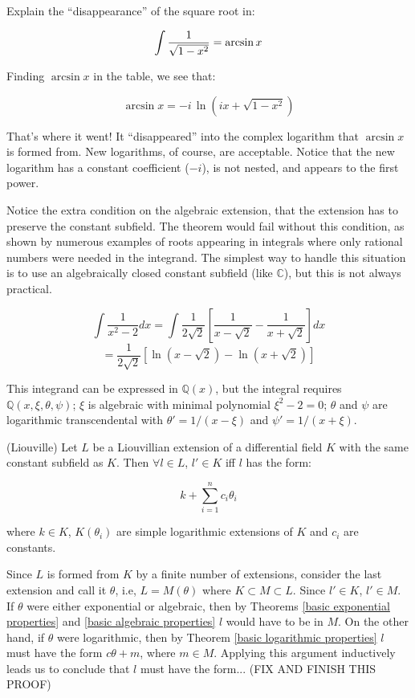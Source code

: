 \endtheorem

\example

Explain the ``disappearance'' of the square root in:

$$\int{1\over\sqrt{1-x^2}} = \arcsin x$$

Finding $\arcsin x$ in the table, we see that:

$$\arcsin x = -i \,\ln (ix + \sqrt{1-x^2})$$

That's where it went!  It ``disappeared'' into the complex logarithm
that $\arcsin x$ is formed from.  New logarithms, of course, are
acceptable.  Notice that the new logarithm has a constant coefficient
($-i$), is not nested, and appears to the first power.

\endexample

Notice the extra condition on the algebraic extension, that the
extension has to preserve the constant subfield.  The theorem would
fail without this condition, as shown by numerous examples of roots
appearing in integrals where only rational numbers were needed in the
integrand.  The simplest way to handle this situation is to use an
algebraically closed constant subfield (like ${\mathbb C}$), but
this is not always practical.

\example

$$\int \frac{1}{x^2-2} dx = \int \frac{1}{2\sqrt{2}} \left[ \frac{1}{x-\sqrt{2}} - \frac{1}{x+\sqrt{2}} \right] dx$$
$$= \frac{1}{2\sqrt{2}} \left[ \ln(x-\sqrt{2}) - \ln(x+\sqrt{2}) \right]$$

This integrand can be expressed in ${\mathbb Q}(x)$, but the integral
requires ${\mathbb Q}(x,\xi,\theta,\psi)$; $\xi$ is algebraic
with minimal polynomial $\xi^2-2=0$; $\theta$ and $\psi$ are
logarithmic transcendental with $\theta' = 1/(x-\xi)$
and $\psi' = 1/(x+\xi)$.

\endexample

\theorem (Liouville) Let $L$ be a Liouvillian extension of
a differential field $K$ with the same constant subfield as $K$.
Then $\forall l \in L$, $l' \in K$ iff $l$ has the form:

$$k + \sum_{i=1}^n c_i \theta_i$$

where $k\in K$, $K(\theta_i)$ are simple logarithmic extensions of $K$ and $c_i$
are constants.

\proof

Since $L$ is formed from $K$ by a finite number of extensions,
consider the last extension and call it $\theta$, i.e, $L=M(\theta)$
where $K \subset M \subset L$.  Since $l' \in K$, $l' \in M$.  If
$\theta$ were either exponential or algebraic, then by Theorems
\ref{basic exponential properties} and \ref{basic algebraic properties}
$l$ would have to be in $M$.  On the other hand, if $\theta$ were
logarithmic, then by Theorem \ref{basic logarithmic properties} $l$
must have the form $c\theta + m$, where $m\in M$.  Applying this
argument inductively leads us to conclude that $l$ must have the
form...  (FIX AND FINISH THIS PROOF)

\endtheorem
